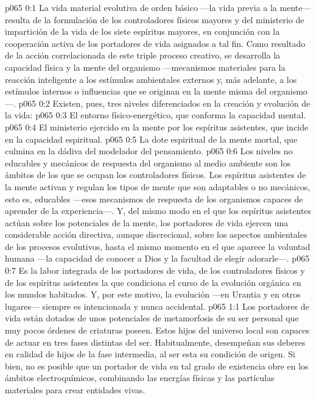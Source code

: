 \author{Portador de vida}
\vs p065 0:1 La vida material evolutiva de orden básico ---la vida previa a la mente--- resulta de la formulación de los controladores físicos mayores y del ministerio de impartición de la vida de los siete espíritus mayores, en conjunción con la cooperación activa de los portadores de vida asignados a tal fin. Como resultado de la acción correlacionada de este triple proceso creativo, se desarrolla la capacidad física y la mente del organismo ---mecanismos materiales para la reacción inteligente a los estímulos ambientales externos y, más adelante, a los estímulos internos o influencias que se originan en la mente misma del organismo---.
\vs p065 0:2 \pc Existen, pues, tres niveles diferenciados en la creación y evolución de la vida:
\vs p065 0:3 El entorno físico\hyp{}energético, que conforma la capacidad mental.
\vs p065 0:4 El ministerio ejercido en la mente por los espíritus asistentes, que incide en la capacidad espiritual.
\vs p065 0:5 La dote espiritual de la mente mortal, que culmina en la dádiva del modelador del pensamiento.
\vs p065 0:6 \pc Los niveles no educables y mecánicos de respuesta del organismo al medio ambiente son los ámbitos de los que se ocupan los controladores físicos. Los espíritus asistentes de la mente activan y regulan los tipos de mente que son adaptables o no mecánicos, esto es, educables ---esos mecanismos de respuesta de los organismos capaces de aprender de la experiencia---. Y, del mismo modo en el que los espíritus asistentes actúan sobre los potenciales de la mente, los portadores de vida ejercen una considerable acción directiva, aunque discrecional, sobre los aspectos ambientales de los procesos evolutivos, hasta el mismo momento en el que aparece la voluntad humana ---la capacidad de conocer a Dios y la facultad de elegir adorarle---.
\vs p065 0:7 Es la labor integrada de los portadores de vida, de los controladores físicos y de los espíritus asistentes la que condiciona el curso de la evolución orgánica en los mundos habitados. Y, por este motivo, la evolución ---en Urantia y en otros lugares--- siempre es intencionada y nunca accidental.
\vs p065 1:1 Los portadores de vida están dotados de unos potenciales de metamorfosis de su ser personal que muy pocos órdenes de criaturas poseen. Estos hijos del universo local son capaces de actuar en tres fases distintas del ser. Habitualmente, desempeñan sus deberes en calidad de hijos de la fase intermedia, al ser esta su condición de origen. Si bien, no es posible que un portador de vida en tal grado de existencia obre en los ámbitos electroquímicos, combinando las energías físicas y las partículas materiales para crear entidades vivas.
